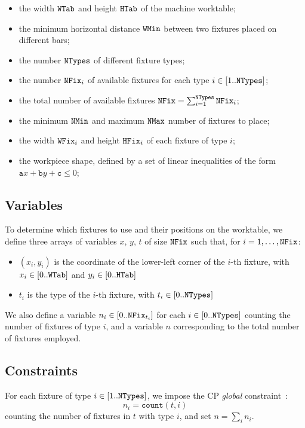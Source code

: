 \begin{itemize}
	\item the width $\mathtt{WTab}$ and height $\mathtt{HTab}$ of the machine worktable;
	\item the minimum horizontal distance $\mathtt{WMin}$ between two fixtures placed on different bars;
	\item the number $\mathtt{NTypes}$ of different fixture types;
	\item the number $\mathtt{NFix}_i$ of available fixtures for each type $i \in [1..\mathtt{NTypes}]$;
	\item the total number of available fixtures $\mathtt{NFix} = \sum_{i=1}^{\mathtt{NTypes}} \mathtt{NFix}_i$;
	\item the minimum $\mathtt{NMin}$ and maximum $\mathtt{NMax}$ number of fixtures to place;
	\item the width $\mathtt{WFix}_i$ and height $\mathtt{HFix}_i$ of each fixture of type $i$;
	\item the workpiece shape, defined by a set of linear inequalities of the form $\mathtt{a}x + \mathtt{b}y + \mathtt{c} \leq 0$;
\end{itemize}

\subsection{Variables}
\label{sec:first_variables}
To determine which fixtures to use and their positions on the worktable, we define three arrays of variables $x$, $y$, $t$ of size $\mathtt{NFix}$ such that, for $i = 1,\dots,\mathtt{NFix}$:
\begin{itemize}
	\item \( (x_i,y_i) \) is the coordinate of the lower-left corner of the $i$-th fixture,  with \( x_i \in [0..\mathtt{WTab}] \) and \( y_i \in [0..\mathtt{HTab}] \)
	\item $t_i$ is the type of the $i$-th fixture, with \( t_i \in [0..\mathtt{NTypes}] \)
\end{itemize}
We also define a variable $n_i \in [0..\mathtt{NFix}_{t_i}]$ for each  \(i \in [0..\mathtt{NTypes}] \) counting the number of fixtures of type $i$, and a variable $n$ 
corresponding to the total number of fixtures employed.

\subsection{Constraints}
\label{sec:first_constraints}
For each fixture of type $i \in [1..\mathtt{NTypes}]$, we impose the CP \emph{global} constraint~\cite{DBLP:journals/constraints/BeldiceanuCDP07}: $$n_i = \mathtt{count}(t,i)$$ counting the number of fixtures in $t$ with type $i$, and set $n = \sum_i n_i$.

